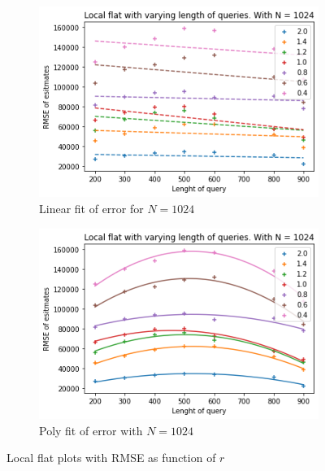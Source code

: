 \documentclass[11pt]{article}
\theoremstyle{definition}
\begin{document}
\begin{figure}[H]
\centering
\begin{subfigure}{.4\textwidth}
  \centering
  \includegraphics[width=\linewidth]{figures/local_flat/varying_r/loc_flat_varying_length_N_linear_=1024.png}
  \caption{Linear fit of error for $N=1024$}
  \label{fig:loc_r_sub1_lin_}
\end{subfigure}%
\begin{subfigure}{.4\textwidth}
  \centering
  \includegraphics[width=\linewidth]{figures/local_flat/varying_r/loc_flat_varying_length_N_poly_=1024.png}
  \caption{Poly fit of error with  $N=1024$}
  \label{fig:loc_r_sub3_lin__}
\end{subfigure}
\caption{Local flat plots with RMSE as function of $r$}
\label{fig:plt_loc_r_lin_poly_1}
\end{figure}
\end{document}
